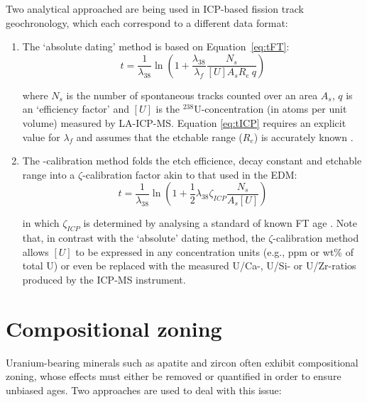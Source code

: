 \begin{refsection}
Two analytical approached are being used in ICP-based fission track
geochronology, which each correspond to a different data format:

\begin{enumerate}
\item The `absolute dating' method is based on
  Equation~\ref{eq:tFT}:
  \begin{equation}
    {t} = \frac{1}{\lambda_{38}}
    \ln \left(1 + \frac{\lambda_{38}}{\lambda_f}\frac{N_s}{[{U}] A_s R_e ~ q}\right)
    \label{eq:tICP}
  \end{equation}

  where $N_s$ is the number of spontaneous tracks counted over an area
  $A_s$, $q$ is an `efficiency factor' \citep[$\sim$0.93 for apatite and
    $\sim$1 for
    zircon,][]{iwano1998,enkelmann2003,jonckheere2003b,soares2013} and
  $[{U}]$ is the $^{238}$U-concentration (in atoms per unit volume)
  measured by LA-ICP-MS. Equation \ref{eq:tICP} requires an explicit
  value for $\lambda_f$ and assumes that the etchable range ($R_e$) is
  accurately known \citep{soares2014}.

\item The \textzeta-calibration method folds the etch efficience,
  decay constant and etchable range into a $\zeta$-calibration factor
  akin to that used in the EDM:
  \begin{equation}
    {t} = \frac{1}{\lambda_{38}}
    \ln \left(1+\frac{1}{2}\lambda_{38}{\zeta}_{ICP}\frac{N_s}{A_s[{U}]}\right)
    \label{eq:tzetahatICP}
  \end{equation}

  in which ${\zeta}_{ICP}$ is determined by analysing a standard of
  known FT age \citep{hasebe2004}. Note that, in contrast with the
  `absolute' dating method, the $\zeta$-calibration method allows
  $[{U}]$ to be expressed in any concentration units (e.g., ppm or
  wt\% of total U) or even be replaced with the measured U/Ca-, U/Si-
  or U/Zr-ratios produced by the ICP-MS instrument.
\end{enumerate}

\section{Compositional zoning}\label{sec:zoning}

Uranium-bearing minerals such as apatite and zircon often exhibit
compositional zoning, whose effects must either be removed or
quantified in order to ensure unbiased ages. Two approaches are used
to deal with this issue:


\end{refsection}
